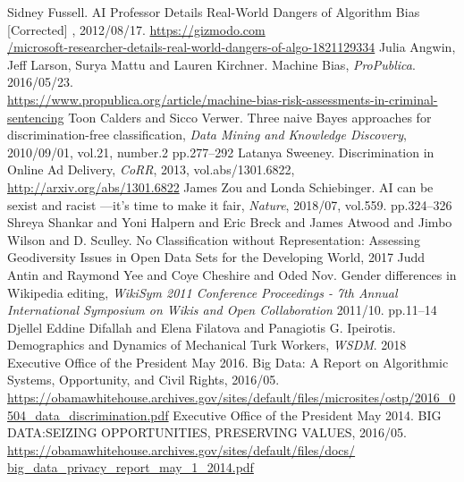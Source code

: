 \documentclass[b5j,twoside,twocolumn]{utarticle}
\begin{document}
\small
\begin{thebibliography}{99}
\small
   Sidney Fussell. AI Professor Details Real-World Dangers of Algorithm Bias [Corrected] , 2012/08/17. \scriptsize \vspace{-1.5mm} \url{https://gizmodo.com}\\ \url{/microsoft-researcher-details-real-world-dangers-of-algo-1821129334}\small
  Julia Angwin, Jeff Larson, Surya Mattu and Lauren Kirchner. Machine Bias, \textsl{ProPublica}. 2016/05/23.\vspace{-1.5mm} \\ \scriptsize \url{https://www.propublica.org/article/machine-bias-risk-assessments-in-criminal-}\vspace{-1.5mm} \\ \url{sentencing}\small
  Toon Calders and Sicco Verwer. Three naive Bayes approaches for discrimination-free classification, \textsl{Data Mining and Knowledge Discovery}, 2010/09/01, vol.21, number.2 pp.277--292
  Latanya Sweeney. Discrimination in Online Ad Delivery, \textsl{CoRR}, 2013, vol.abs/1301.6822,  \scriptsize \url{http://arxiv.org/abs/1301.6822}\small
  James Zou and Londa Schiebinger. AI can be sexist and racist —it’s time to make it fair, \textsl{Nature}, 2018/07, vol.559. pp.324--326
  Shreya Shankar and Yoni Halpern and Eric Breck and James Atwood and Jimbo Wilson and D. Sculley. No Classification without Representation: Assessing Geodiversity Issues in Open Data Sets for the Developing World, 2017
  Judd Antin and Raymond Yee and Coye Cheshire and Oded Nov. Gender differences in Wikipedia editing, \textsl{WikiSym 2011 Conference Proceedings - 7th Annual International Symposium on Wikis and Open Collaboration} 2011/10. pp.11--14
  Djellel Eddine Difallah and Elena Filatova and Panagiotis G. Ipeirotis. Demographics and Dynamics of Mechanical Turk Workers, \textsl{WSDM}. 2018
  Executive Office of the President May 2016. Big Data: A Report on Algorithmic Systems, Opportunity, and Civil Rights, 2016/05. \vspace{-1.5mm} \scriptsize \url{https://obamawhitehouse.archives.gov/sites/default/files/microsites/ostp/2016_0504_data_discrimination.pdf}\small
  Executive Office of the President May 2014. BIG DATA:SEIZING OPPORTUNITIES, PRESERVING VALUES, 2016/05.  \vspace{-1.5mm} \scriptsize \url{https://obamawhitehouse.archives.gov/sites/default/files/docs/}\vspace{-1.5mm}\\ \url{big_data_privacy_report_may_1_2014.pdf}\small

\end{thebibliography}
\end{document}
